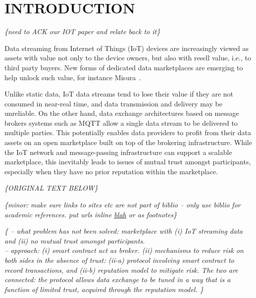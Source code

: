 \documentclass[letterpaper, 10 pt, conference]{ieeeconf}  %
\newcommand{\mynote}[1]{{\leavevmode\smaller\itshape\color{red}\{#1\}}}
\newcommand{\anote}[1]{{\leavevmode\smaller\itshape\color{red}\{#1\}}}
\begin{document}
\section{INTRODUCTION}


\mynote{need to ACK our IOT paper and relate back to it}


Data streaming from Internet of Things (IoT) devices are increasingly viewed as assets with value not only to the device owners, but also with resell value, i.e., to third party buyers. 
New forms of dedicated data marketplaces are emerging to help unlock such value, for instance Misura~\cite{misura}.

Unlike static data,  IoT data streams tend to lose their value if they are not consumed in near-real time, and data transmission and delivery may be unreliable. 
On the other hand, data exchange architectures based on message brokers systems such as MQTT allow a single data stream to be delivered to multiple parties. 
This potentially enables data providers to profit from their data assets on an open marketplace built on top of the brokering infrastructure.
While the IoT network and message-passing infrastructure can support a scalable marketplace, this inevitably leads to issues of mutual trust amongst participants, especially when they have no prior reputation within the marketplace.


\mynote{ORIGINAL TEXT BELOW}


\anote{minor: make sure links to sites etc are not part of biblio -- only use biblio for academic references.  put urls inline \url{blah} or as footnotes}

\anote{
	-- what problem has not been solved: marketplace with (i) IoT streaming data and (ii) no mutual trust amongst participants. \\
	-- approach: (i) smart contract act as broker. (ii) mechanisms to reduce risk on both sides in the absence of trust: (ii-a) protocol involving smart contract to record transactions, and (ii-b) reputation model to mitigate risk. The two are connected: the protocol allows data exchange to be tuned in a way that is a function of limited trust, acquired through the reputation model.
}



\end{document}

